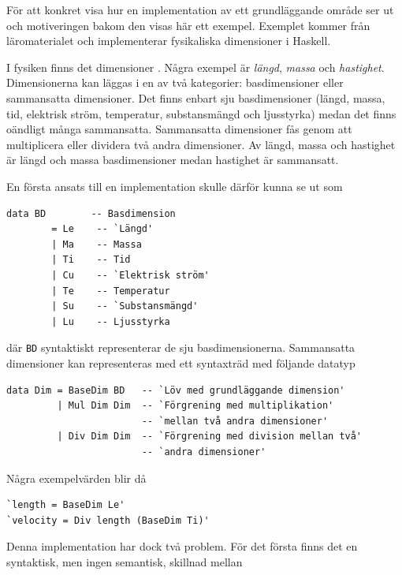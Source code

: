 För att konkret visa hur en implementation av ett grundläggande område ser ut
och motiveringen bakom den visas här ett exempel. Exemplet kommer från
läromaterialet och implementerar fysikaliska dimensioner i Haskell.

I fysiken finns det dimensioner \cite{dimensioner_ne}. Några exempel är \textit{längd},
\textit{massa} och \textit{hastighet}. Dimensionerna kan läggas i en av två
kategorier: basdimensioner eller sammansatta dimensioner. Det finns enbart sju
basdimensioner (längd, massa, tid, elektrisk ström, temperatur, substansmängd och
ljusstyrka) medan det finns oändligt många sammansatta. Sammansatta
dimensioner fås genom att multiplicera eller dividera två andra dimensioner. Av längd, massa och hastighet är längd och massa basdimensioner medan hastighet är sammansatt.

En första ansats till en implementation skulle därför kunna se ut som

\begin{lstlisting}[frame=none, belowskip=-0.5\baselineskip, xleftmargin=0.5in]
 data BD        -- Basdimension
        = Le    -- `Längd'
        | Ma    -- Massa
        | Ti    -- Tid
        | Cu    -- `Elektrisk ström'
        | Te    -- Temperatur
        | Su    -- `Substansmängd'
        | Lu    -- Ljusstyrka
\end{lstlisting}

där \texttt{BD} syntaktiskt representerar de sju basdimensionerna.
Sammansatta dimensioner kan representeras med ett syntaxträd med följande datatyp

\begin{lstlisting}[frame=none, belowskip=-0.5\baselineskip, xleftmargin=0.5in]
data Dim = BaseDim BD   -- `Löv med grundläggande dimension'
         | Mul Dim Dim  -- `Förgrening med multiplikation'
                        -- `mellan två andra dimensioner'
         | Div Dim Dim  -- `Förgrening med division mellan två'
                        -- `andra dimensioner'
\end{lstlisting}

Några exempelvärden blir då

\begin{lstlisting}[frame=none, belowskip=-0.5\baselineskip, xleftmargin=0.5in]
`length = BaseDim Le'
`velocity = Div length (BaseDim Ti)'
\end{lstlisting}

Denna implementation har dock två problem. För det första finns det en
syntaktisk, men ingen semantisk, skillnad mellan

